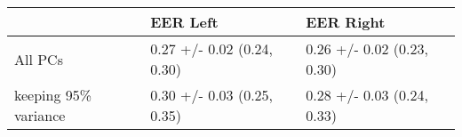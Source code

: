 \begin{tabular}{lll}
\toprule
{} &                    EER Left &                   EER Right \\
\midrule
All PCs              &  0.27 +/- 0.02 (0.24, 0.30) &  0.26 +/- 0.02 (0.23, 0.30) \\
keeping 95\% variance &  0.30 +/- 0.03 (0.25, 0.35) &  0.28 +/- 0.03 (0.24, 0.33) \\
\bottomrule
\end{tabular}
